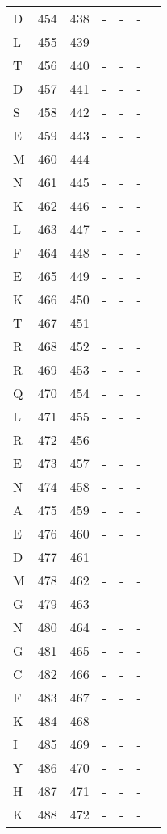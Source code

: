 \begin{longtable}{lllllll}
  D & 454 & 438 & - & - & - &  \\ 
  L & 455 & 439 & - & - & - &  \\ 
  T & 456 & 440 & - & - & - &  \\ 
  D & 457 & 441 & - & - & - &  \\ 
  S & 458 & 442 & - & - & - &  \\ 
  E & 459 & 443 & - & - & - &  \\ 
  M & 460 & 444 & - & - & - &  \\ 
  N & 461 & 445 & - & - & - &  \\ 
  K & 462 & 446 & - & - & - &  \\ 
  L & 463 & 447 & - & - & - &  \\ 
  F & 464 & 448 & - & - & - &  \\ 
  E & 465 & 449 & - & - & - &  \\ 
  K & 466 & 450 & - & - & - &  \\ 
  T & 467 & 451 & - & - & - &  \\ 
  R & 468 & 452 & - & - & - &  \\ 
  R & 469 & 453 & - & - & - &  \\ 
  Q & 470 & 454 & - & - & - &  \\ 
  L & 471 & 455 & - & - & - &  \\ 
  R & 472 & 456 & - & - & - &  \\ 
  E & 473 & 457 & - & - & - &  \\ 
  N & 474 & 458 & - & - & - &  \\ 
  A & 475 & 459 & - & - & - &  \\ 
  E & 476 & 460 & - & - & - &  \\ 
  D & 477 & 461 & - & - & - &  \\ 
  M & 478 & 462 & - & - & - &  \\ 
  G & 479 & 463 & - & - & - &  \\ 
  N & 480 & 464 & - & - & - &  \\ 
  G & 481 & 465 & - & - & - &  \\ 
  C & 482 & 466 & - & - & - &  \\ 
  F & 483 & 467 & - & - & - &  \\ 
  K & 484 & 468 & - & - & - &  \\ 
  I & 485 & 469 & - & - & - &  \\ 
  Y & 486 & 470 & - & - & - &  \\ 
  H & 487 & 471 & - & - & - &  \\ 
  K & 488 & 472 & - & - & - &  \\ 

\end{longtable}
